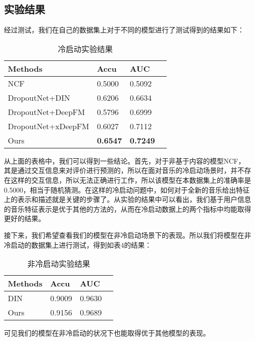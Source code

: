 \subsection{实验结果}
经过测试，我们在自己的数据集上对于不同的模型进行了测试得到的结果如下：
\begin{table}[htbp]
\centering
\caption{冷启动实验结果}
\begin{tabular}{|l|l|l|l|}
\hline

Methods & Accu & AUC \\ \hline
NCF &  0.5000 & 0.5092 \\ \hline
DropoutNet+DIN & 0.6206 & 0.6634 \\ \hline
DropoutNet+DeepFM & 0.5796 & 0.6999 \\ \hline
DropoutNet+xDeepFM & 0.6027 & 0.7112 \\ \hline
Ours & \textbf{0.6547} & \textbf{0.7249} \\ \hline

\end{tabular}
\end{table}

从上面的表格中，我们可以得到一些结论。首先，对于非基于内容的模型NCF，其是通过交互信息来对评价进行预测的，所以在面对音乐的冷启动场景时，并不存在这样的交互信息，所以无法正确进行工作，所以该模型在本数据集上的准确率是0.5000，相当于随机猜测。在这样的冷启动问题中，如何对于全新的音乐给出特征上的表示和描述就是关键的步骤了。从实验的结果中可以看出，我们基于用户信息的音乐特征表示是优于其他的方法的，从而在冷启动数据上的两个指标中均能取得更好的结果。

接下来，我们希望查看我们的模型在非冷启动场景下的表现。所以我们将模型在非冷启动的数据集上进行测试，得到如表4的结果：

\begin{table}[htbp]
\centering
\caption{非冷启动实验结果}
\begin{tabular}{|l|l|l|l|}
\hline

Methods & Accu & AUC \\ \hline
DIN & 0.9009 & 0.9630 \\ \hline
Ours & 0.9156 & 0.9689 \\ \hline

\end{tabular}
\end{table}

可见我们的模型在非冷启动的状况下也能取得优于其他模型的表现。

